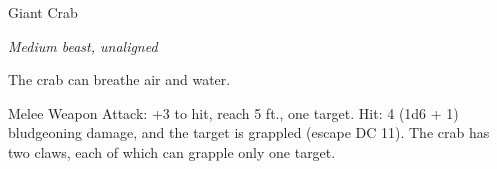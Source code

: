 \begin{monsterbox}{Giant Crab}
\begin{hangingpar}
\textit{Medium beast, unaligned}
\end{hangingpar}
\dndline%
\basics[%
armorclass = 15,
hitpoints = 3d8,
speed = {30 ft., swim 30 ft.}
]
\dndline%
\stats[%
STR = \stat{13},
DEX = \stat{15},
CON = \stat{11},
INT = \stat{1},
WIS = \stat{9},
CHA = \stat{3}
]
\dndline%
\details[%
skills={Stealth +4, },
damageimmunities={},
savingthrows={},
conditionimmunities={},
damageresistances={},
damagevulnerabilities={},
senses={blindsight 30 ft., passive Perception 9},
challenge=1/8
]
\dndline%
\begin{monsteraction}[Amphibious]
The crab can breathe air and water.
\end{monsteraction}
\begin{monsteraction}[Claw]
Melee Weapon Attack: +3 to hit, reach 5 ft., one target. Hit: 4 (1d6 + 1) bludgeoning damage, and the target is grappled (escape DC 11). The crab has two claws, each of which can grapple only one target.
\end{monsteraction}
\end{monsterbox}